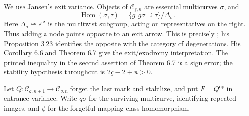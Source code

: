 We use Jansen's exit variance. Objects of $\mathcal C_{g,n}$ are
essential multicurves $\sigma$, and
\[
 \operatorname{Hom}(\sigma,\tau)
  =\{g:g\sigma\supseteq\tau\}/\Delta_\sigma.
\]
Here $\Delta_\sigma\cong\mathbb Z^\sigma$ is the multitwist
subgroup, acting on representatives on the right. Thus adding a
node points opposite to an exit arrow. This is precisely \citet[Construction 3.18]{GHIJJansen2023}; his Proposition 3.23 identifies the
opposite with the category of degenerations. His Corollary 6.6
and Theorem 6.7 give the exit/exodromy interpretation. The printed
inequality in the second assertion of Theorem 6.7 is a sign error;
the stability hypothesis throughout is $2g-2+n>0$.

Let $Q:\mathcal C_{g,n+1}\to\mathcal C_{g,n}$ forget the last mark
and stabilize, and put $F=Q^{\mathrm{op}}$ in entrance variance.
Write $q\sigma$ for the surviving multicurve, identifying repeated
images, and $\phi$ for the forgetful mapping-class homomorphism.

